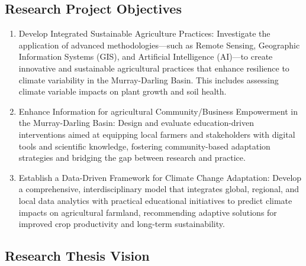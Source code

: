 


\subsection{Research Project Objectives}
\begin{enumerate}
    \item Develop Integrated Sustainable Agriculture Practices: Investigate the application of advanced methodologies—such as Remote Sensing, Geographic Information Systems (GIS), and Artificial Intelligence (AI)—to create innovative and sustainable agricultural practices that enhance resilience to climate variability in the Murray-Darling Basin. This includes assessing climate variable impacts on plant growth and soil health.
    
    \item Enhance Information for agricultural Community/Business Empowerment in the Murray-Darling Basin: Design and evaluate education-driven interventions aimed at equipping local farmers and stakeholders with digital tools and scientific knowledge, fostering community-based adaptation strategies and bridging the gap between research and practice.
    
    \item Establish a Data-Driven Framework for Climate Change Adaptation: Develop a comprehensive, interdisciplinary model that integrates global, regional, and local data analytics with practical educational initiatives to predict climate impacts on agricultural farmland, recommending adaptive solutions for improved crop productivity and long-term sustainability.
\end{enumerate}

\subsection{Research Thesis Vision}

